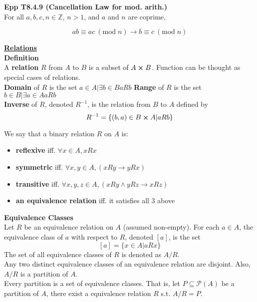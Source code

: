 \documentclass[a4paper]{article}
\newcommand{\heading}[1]{{\small\underline{\textbf{#1}}}}
\newcommand{\subheading}[1]{{\scriptsize\textbf{#1}}}
\begin{document}
\begin{multicols*}{4}
\subheading{Epp T8.4.9 (Cancellation Law for mod. arith.)}\\
For all $a, b, c, n \in \mathbb{Z}$, $n>1$, and $a$ and $n$ are coprime,

$$ ab \equiv ac\ (\mathrm{mod}\;n) \rightarrow b \equiv c\ (\mathrm{mod}\;n) $$

\heading{Relations}\\

\subheading{Definition}\\
A \textbf{relation} $R$ from $A$ to $B$ is a subset of $A \cross B$. Function can be thought as special cases of relations.\\

\textbf{Domain} of $R$ is the set ${a \in A | \exists b \in B aRb}$
\textbf{Range} of $R$ is the set ${b \in B | \exists a \in A aRb}$\\

\textbf{Inverse} of $R$, denoted $R^{-1}$, is the relation from $B$ to $A$ defined by
$$ R^{-1} = \{(b,a) \in B \cross A | a R b\}$$

We say that a binary relation $R$ on $A$ is:
\begin{itemize}
	\item \textbf{reflexive} iff. $\forall x \in A, xRx$
	\item \textbf{symmetric} iff. $\forall x,y \in A, (xRy \rightarrow yRx)$
	\item \textbf{transitive} iff. $\forall x,y,z \in A, (xRy \land yRz \rightarrow xRz)$
	\item \textbf{an equivalence relation} iff. it satisfies all 3 above
\end{itemize}

\subheading{Equivalence Classes}\\
Let $R$ be an equivalence relation on $A$ (assumed non-empty). For each $a \in A$, the equivalence class of $a$ with respect to $R$, denoted ${[a]}$, is the set
$$ {[a]} = \{x \in A | aRx\} $$
The set of all equivalence classes of $R$ is denoted as $A/R$.\\

Any two distinct equivalence classes of an equivalence relation are disjoint. Also, $A/R$ is a partition of $A$.\\

Every partition is a set of equivalence classes. That is, let $P \subseteq \mathcal{P}(A)$ be a partition of $A$, there exist a equivalence relation $R$ s.t. $A/R = P$.\\


\end{multicols*}
\end{document}
